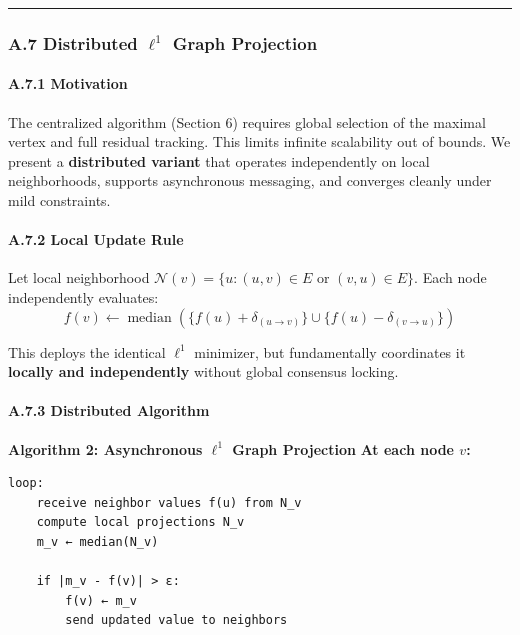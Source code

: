 \documentclass[
]{article}
\begin{document}
\begin{center}\rule{0.5\linewidth}{0.5pt}\end{center}

\subsubsection{\texorpdfstring{A.7 Distributed \(\ell^1\) Graph
Projection}{A.7 Distributed \textbackslash ell\^{}1 Graph Projection}}\label{a.7-distributed-ell1-graph-projection}

\paragraph{A.7.1 Motivation}\label{a.7.1-motivation}

The centralized algorithm (Section 6) requires global selection of the
maximal vertex and full residual tracking. This limits infinite
scalability out of bounds. We present a \textbf{distributed variant}
that operates independently on local neighborhoods, supports
asynchronous messaging, and converges cleanly under mild constraints.

\paragraph{A.7.2 Local Update Rule}\label{a.7.2-local-update-rule}

Let local neighborhood
\(\mathcal{N}(v) = \{u : (u,v) \in E \text{ or } (v,u) \in E\}\). Each
node independently evaluates:
\[ f(v) \leftarrow \operatorname{median}\left( \{ f(u) + \delta_{(u \to v)} \} \cup \{ f(u) - \delta_{(v \to u)} \} \right) \]

This deploys the identical \(\ell^1\) minimizer, but fundamentally
coordinates it \textbf{locally and independently} without global
consensus locking.

\paragraph{A.7.3 Distributed
Algorithm}\label{a.7.3-distributed-algorithm}

\textbf{Algorithm 2: Asynchronous \(\ell^1\) Graph Projection}
\textbf{At each node \(v\):}

\begin{verbatim}
loop:
    receive neighbor values f(u) from N_v
    compute local projections N_v
    m_v ← median(N_v)
    
    if |m_v - f(v)| > ε:
        f(v) ← m_v
        send updated value to neighbors
\end{verbatim}
\end{document}
